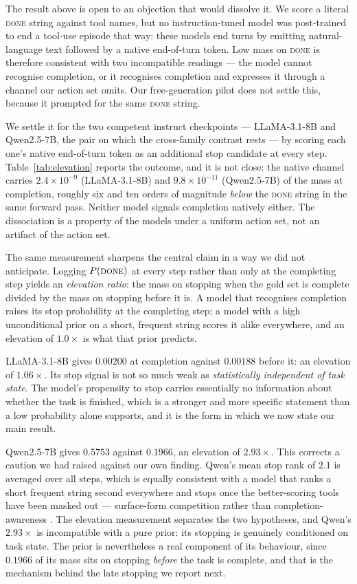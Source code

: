 \documentclass[11pt]{article}
\newcommand{\done}{\ensuremath{\text{\textsc{done}}}}
\begin{document}
The result above is open to an objection that would dissolve it. We score a
literal \textsc{done} string against tool names, but no instruction-tuned model
was post-trained to end a tool-use episode that way: these models end turns by
emitting natural-language text followed by a native end-of-turn token. Low mass on
\textsc{done} is therefore consistent with two incompatible readings --- the model
cannot recognise completion, or it recognises completion and expresses it through
a channel our action set omits. Our free-generation pilot does not settle this,
because it prompted for the same \textsc{done} string.

We settle it for the two competent instruct checkpoints --- LLaMA-3.1-8B and
Qwen2.5-7B, the pair on which the cross-family contrast rests --- by scoring each
one's native end-of-turn token as an additional stop candidate at every step.
Table~\ref{tab:elevation} reports the outcome, and it is not close: the native channel carries $2.4\times10^{-9}$ (LLaMA-3.1-8B) and
$9.8\times10^{-11}$ (Qwen2.5-7B) of the mass at completion, roughly six and ten orders
of magnitude \emph{below} the \textsc{done} string in the same forward pass.
Neither model signals completion natively either. The dissociation is a property
of the models under a uniform action set, not an artifact of the action set.

The same measurement sharpens the central claim in a way we did not anticipate.
Logging $P(\done)$ at every step rather than only at the completing step yields an
\emph{elevation ratio}: the mass on stopping when the gold set is complete divided
by the mass on stopping before it is. A model that recognises completion raises
its stop probability at the completing step; a model with a high unconditional
prior on a short, frequent string scores it alike everywhere, and an elevation of
$1.0\times$ is what that prior predicts.

LLaMA-3.1-8B gives $0.00200$ at completion against $0.00188$ before it: an
elevation of $1.06\times$. Its stop signal is not so much weak as
\emph{statistically independent of task state}. The model's propensity to stop
carries essentially no information about whether the task is finished, which is a
stronger and more specific statement than a low probability alone supports, and it
is the form in which we now state our main result.

Qwen2.5-7B gives $0.5753$ against $0.1966$, an elevation of $2.93\times$. This
corrects a caution we had raised against our own finding. Qwen's mean stop rank of
$2.1$ is averaged over all steps, which is equally consistent with a model that
ranks a short frequent string second everywhere and stops once the better-scoring
tools have been masked out --- surface-form competition rather than
completion-awareness \citep{holtzman2021surface}. The elevation measurement
separates the two hypotheses, and Qwen's $2.93\times$ is incompatible with a pure
prior: its stopping is genuinely conditioned on task state. The prior is
nevertheless a real component of its behaviour, since $0.1966$ of its mass sits on
stopping \emph{before} the task is complete, and that is the mechanism behind the
late stopping we report next.
\end{document}
